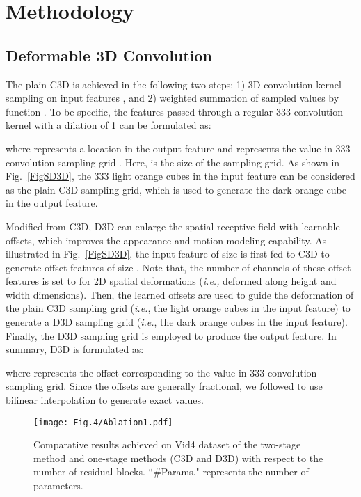 \documentclass[journal]{IEEEtran}
\begin{document}
\section{Methodology}\label{Methodology}

\subsection{Deformable 3D Convolution}\label{SecD3D}

 The plain C3D  \cite{C3D} is achieved in the following two steps: 1) 3D convolution kernel sampling on input features , and 2) weighted summation of sampled values by function . To be specific, the features passed through a regular 333 convolution kernel with a dilation of 1 can be formulated as:

where   represents a location in the output feature and  represents the  value in 333 convolution sampling grid . Here,  is the size of the sampling grid. As shown in Fig.~\ref{FigSD3D}, the 333 light orange cubes in the input feature can be considered as the plain C3D sampling grid, which is used to generate the dark orange cube in the output feature.

Modified from C3D, D3D can enlarge the spatial receptive field with learnable offsets, which improves the appearance and motion modeling capability. As illustrated in Fig.~\ref{FigSD3D}, the input feature of size  is first fed to C3D to generate offset features of size . Note that, the number of channels of these offset features is set to  for 2D spatial deformations (\textit{i.e.,} deformed along height and width dimensions). Then, the learned offsets are used to guide the deformation of the plain C3D sampling grid (\textit{i.e.}, the light orange cubes in the input feature) to generate a D3D sampling grid (\textit{i.e.}, the dark orange cubes in the input feature). Finally, the D3D sampling grid is employed to produce the output feature. In summary, D3D is formulated as:

where  represents the offset corresponding to the  value in  333 convolution sampling grid.
Since the offsets are generally fractional, we followed \cite{DCN1, DCN2} to use bilinear interpolation to generate exact values.



\begin{figure}[t]
\vspace{-.1in}
\centering\texttt{[image: Fig.4/Ablation1.pdf]}
\caption{Comparative results achieved on Vid4 \cite{VESPCN} dataset of the two-stage method and one-stage methods (C3D and D3D) with respect to the number of residual blocks. ``\#Params." represents the number of parameters.}\label{FigAblation}
\end{figure}
\end{document}
